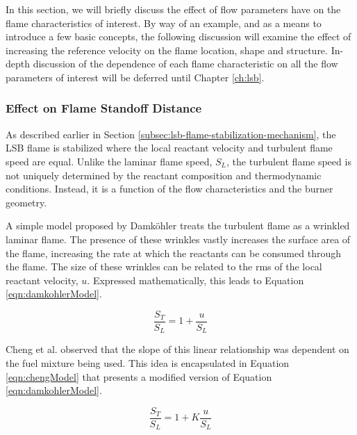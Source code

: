 In this section, we will briefly discuss the effect of flow parameters have on the flame characteristics of interest.
By way of an example, and as a means to introduce a few basic concepts, the following discussion will examine the effect of increasing the reference velocity on the flame location, shape and structure.
In-depth discussion of the dependence of each flame characteristic on all the flow parameters of interest will be deferred until Chapter \ref{ch:lsb}.

\subsubsection{Effect on Flame Standoff Distance}
\label{subsubsec:flame-characteristics-standoff}

As described earlier in Section \ref{subsec:lsb-flame-stabilization-mechanism}, the LSB flame is stabilized where the local reactant velocity and turbulent flame speed are equal.
Unlike the laminar flame speed, \(S_L\), the turbulent flame speed is not uniquely determined by the reactant composition and thermodynamic conditions.
Instead, it is a function of the flow characteristics and the burner geometry.


A simple model proposed by Damk{\"o}hler\cite{1940-damkohler} treats the turbulent flame as a wrinkled laminar flame.
The presence of these wrinkles vastly increases the surface area of the flame, increasing the rate at which the reactants can be consumed through the flame.
The size of these wrinkles can be related to the rms of the local reactant velocity, \(u\).
Expressed mathematically, this leads to Equation \ref{eqn:damkohlerModel}.

\begin{equation}
\frac{ S_T }{ S_L } = 1 + \frac{ u }{ S_L }
\label{eqn:damkohlerModel}
\end{equation}


Cheng et al.\cite{2002-cheng,2009-cheng,2010-littlejohn} observed that the slope of this linear relationship was dependent on the fuel mixture being used.
This idea is encapsulated in Equation \ref{eqn:chengModel} that presents a modified version of Equation \ref{eqn:damkohlerModel}.

\begin{equation}
\frac{ S_T }{ S_L } = 1 + K \frac{ u }{ S_L }
\label{eqn:chengModel}
\end{equation}

